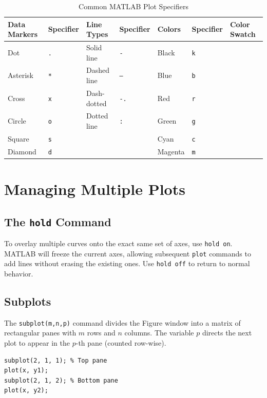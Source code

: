 \begin{table}[h]
\centering
\begin{tabular}{ll|ll|lll}
\toprule
\textbf{Data Markers} & \textbf{Specifier} & \textbf{Line Types} & \textbf{Specifier} & \textbf{Colors} & \textbf{Specifier} & \textbf{Color Swatch} \\
\midrule
Dot & \texttt{.} & Solid line & \texttt{-} & Black & \texttt{k} & \cellcolor{black} \\
Asterisk & \texttt{*} & Dashed line & \texttt{--} & Blue & \texttt{b} & \cellcolor{blue} \\
Cross & \texttt{x} & Dash-dotted & \texttt{-.} & Red & \texttt{r} & \cellcolor{red} \\
Circle & \texttt{o} & Dotted line & \texttt{:} & Green & \texttt{g} & \cellcolor{green} \\
Square & \texttt{s} & & & Cyan & \texttt{c} & \cellcolor{cyan} \\
Diamond & \texttt{d} & & & Magenta & \texttt{m} & \cellcolor{magenta} \\
\bottomrule
\end{tabular}
\caption{Common MATLAB Plot Specifiers}
\end{table}

\section{Managing Multiple Plots}
\subsection{The \texttt{hold} Command}
To overlay multiple curves onto the exact same set of axes, use \texttt{hold on}. MATLAB will freeze the current axes, allowing subsequent \texttt{plot} commands to add lines without erasing the existing ones. Use \texttt{hold off} to return to normal behavior.

\subsection{Subplots}
The \texttt{subplot(m,n,p)} command divides the Figure window into a matrix of rectangular panes with $m$ rows and $n$ columns. The variable $p$ directs the next plot to appear in the $p$-th pane (counted row-wise).
\begin{lstlisting}
subplot(2, 1, 1); % Top pane
plot(x, y1);
subplot(2, 1, 2); % Bottom pane
plot(x, y2);
\end{lstlisting}


